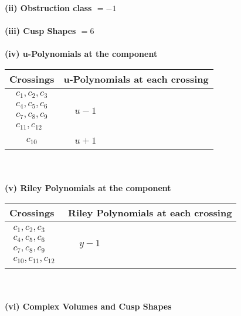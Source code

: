 \documentclass[1p]{elsarticle_modified}
\theoremstyle{definition}
\begin{document}
\flushleft \textbf{(ii) Obstruction class $= -1$}\\~\\
\flushleft \textbf{(iii) Cusp Shapes $= 6$}\\~\\
\newpage\renewcommand{\arraystretch}{1}
\flushleft \textbf{(iv) u-Polynomials at the component}\newline \\
\begin{tabular}{m{50pt}|m{274pt}}
Crossings & \hspace{64pt}u-Polynomials at each crossing \\
\hline $$\begin{aligned}c_{1},c_{2},c_{3}\\c_{4},c_{5},c_{6}\\c_{7},c_{8},c_{9}\\c_{11},c_{12}\end{aligned}$$&$\begin{aligned}
&u-1
\end{aligned}$\\
\hline $$\begin{aligned}c_{10}\end{aligned}$$&$\begin{aligned}
&u+1
\end{aligned}$\\
\hline
\end{tabular}\\~\\
\newpage\renewcommand{\arraystretch}{1}
\flushleft \textbf{(v) Riley Polynomials at the component}\newline \\
\begin{tabular}{m{50pt}|m{274pt}}
Crossings & \hspace{64pt}Riley Polynomials at each crossing \\
\hline $$\begin{aligned}c_{1},c_{2},c_{3}\\c_{4},c_{5},c_{6}\\c_{7},c_{8},c_{9}\\c_{10},c_{11},c_{12}\end{aligned}$$&$\begin{aligned}
&y-1
\end{aligned}$\\
\hline
\end{tabular}\\~\\
\newpage\flushleft \textbf{(vi) Complex Volumes and Cusp Shapes}
\end{document}
